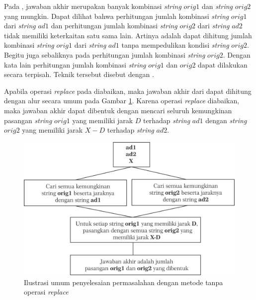 Pada \problem{}, jawaban akhir merupakan banyak kombinasi \textit{string} $ orig1 $ dan \textit{string} $ orig2 $ yang mungkin. Dapat dilihat bahwa perhitungan jumlah kombinasi \textit{string} $ orig1 $ dari \textit{string} $ ad1 $ dan perhitungan jumlah kombinasi \textit{string} $ orig2 $ dari \textit{string} $ ad2 $ tidak memiliki keterkaitan satu sama lain. Artinya adalah dapat dihitung jumlah kombinasi \textit{string} $ orig1 $ dari \textit{string} $ ad1 $ tanpa mempedulikan kondisi \textit{string} $ orig2 $. Begitu juga sebaliknya pada perhitungan jumlah kombinasi \textit{string} $ orig2 $. Dengan kata lain perhitungan jumlah kombinasi \textit{string} $ orig1 $ dan $ orig2 $ dapat dilakukan secara terpisah. Teknik tersebut disebut dengan \meetinthemiddle{}.

Apabila operasi \textit{replace} pada \problem{} diabaikan, maka jawaban akhir dari dapat dihitung dengan alur secara umum pada Gambar \ref{figure:ilustrasi_umum_penyelesaian_meet_in_the_middle_tanpa_operasi_replace}. Karena operasi \textit{replace} diabaikan, maka jawaban akhir dapat dibentuk dengan mencari seluruh kemungkinan pasangan \textit{string} $ orig1 $ yang memiliki jarak $ D $ terhadap \textit{string} $ ad1 $ dengan \textit{string} $ orig2 $ yang memiliki jarak $ X - D $ terhadap \textit{string} $ ad2 $. 

\begin{figure}
	\centerline{ \includegraphics[scale=0.4]{assets/images/jpg/ilustrasi-umum-tanpa-replace.jpg}}
	\caption{Ilustrasi umum penyelesaian permasalahan dengan metode \meetinthemiddle{} tanpa operasi \textit{replace}}
	\label{figure:ilustrasi_umum_penyelesaian_meet_in_the_middle_tanpa_operasi_replace}
\end{figure}

